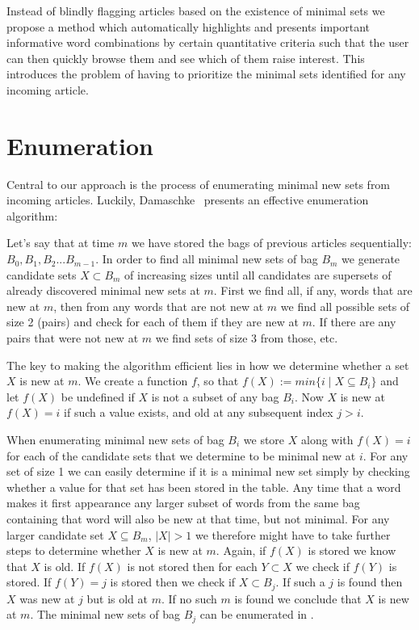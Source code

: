 Instead of blindly flagging articles based on the existence of minimal sets we propose a method which automatically highlights and presents important informative word combinations by certain quantitative criteria such that the user can then quickly browse them and see which of them raise interest. This introduces the problem of having to prioritize the minimal sets identified for any incoming article.

\section{Enumeration}
\label{method:enumeration}
Central to our approach is the process of enumerating minimal new sets from incoming articles. Luckily, Damaschke~\cite{damaschke2015pairs} presents an effective enumeration algorithm:

Let's say that at time $m$ we have stored the bags of previous articles sequentially: $B_0, B_1, B_2...B_{m-1}$. In order to find all minimal new sets of bag $B_{m}$ we generate candidate sets $X \subset B_{m}$ of increasing sizes until all candidates are supersets of already discovered minimal new sets at $m$. First we find all, if any, words that are new at $m$, then from any words that are not new at $m$ we find all possible sets of size 2 (pairs) and check for each of them if they are new at $m$. If there are any pairs that were not new at $m$ we find sets of size 3 from those, etc. 

The key to making the algorithm efficient lies in how we determine whether a set $X$ is new at $m$. We create a function $f$, so that $f(X) := min\{i \mid X \subseteq B_{i}\}$ and let $f(X)$ be undefined if $X$ is not a subset of any bag $B_{i}$. Now $X$ is new at $f(X)=i$ if such a value exists, and old at any subsequent index $j>i$. 

When enumerating minimal new sets of bag $B_{i}$ we store $X$ along with $f(X)=i$ for each of the candidate sets that we determine to be minimal new at $i$. For any set of size 1 we can easily determine if it is a minimal new set simply by checking whether a value for that set has been stored in the table.  Any time that a word makes it first appearance any larger subset of words from the same bag containing that word will also be new at that time, but not minimal. For any larger candidate set $X \subseteq B_{m}$, $|X|>1$ we therefore might have to take further steps to determine whether $X$ is new at $m$. Again, if $f(X)$ is stored we know that $X$ is old. If $f(X)$ is not stored then for each $Y \subset X$ we check if $f(Y)$ is stored. If $f(Y)=j$ is stored then we check if $X \subset B_{j}$. If such a $j$ is found then $X$ was new at $j$ but is old at $m$. If no such $m$ is found we conclude that $X$ is new at $m$. The minimal new sets of bag $B_{j}$ can be enumerated in .


